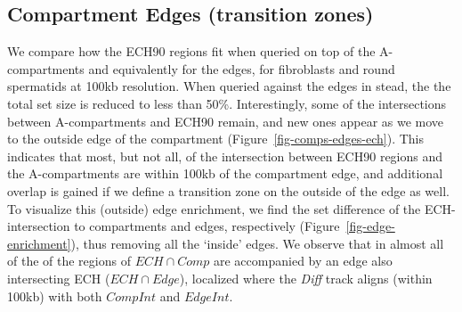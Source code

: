 \documentclass[
  11pt,
  a4paper,
]{scrbook}
\let\oldemph\emph
\renewcommand\emph[1]{\oldemph{\color{gray}#1}}
\begin{document}
\subsection{Compartment Edges (transition
zones)}\label{compartment-edges-transition-zones}

We compare how the ECH90 regions fit when queried on top of the
A-compartments and equivalently for the edges, for fibroblasts and round
spermatids at 100kb resolution. When queried against the edges in stead,
the the total set size is reduced to less than 50\%. Interestingly, some
of the intersections between A-compartments and ECH90 remain, and new
ones appear as we move to the outside edge of the compartment
(Figure~\ref{fig-comps-edges-ech}). This indicates that most, but not
all, of the intersection between ECH90 regions and the A-compartments
are within 100kb of the compartment edge, and additional overlap is
gained if we define a transition zone on the outside of the edge as
well. To visualize this (outside) edge enrichment, we find the set
difference of the ECH-intersection to compartments and edges,
respectively (Figure~\ref{fig-edge-enrichment}), thus removing all the
`inside' edges. We observe that in almost all of the of the regions of
\(ECH \cap Comp\) are accompanied by an edge also intersecting ECH
(\(ECH \cap Edge\)), localized where the \emph{Diff} track aligns
(within 100kb) with both \(CompInt\) and \(EdgeInt\).
\end{document}
